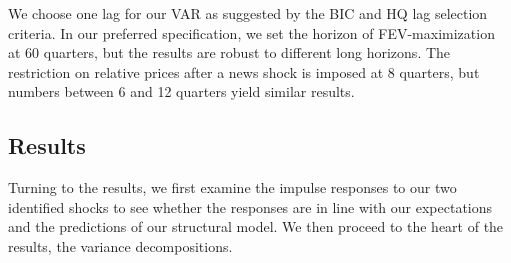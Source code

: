 \documentclass[11pt]{article}
\renewcommand{\[}{\begin{equation}}
\renewcommand{\]}{\end{equation}}
\begin{document}
We choose one lag for our VAR as suggested by the BIC and HQ lag selection criteria. In our preferred specification, we set the horizon of FEV-maximization at 60 quarters, but the results are robust to different long horizons. The restriction on relative prices after a news shock is imposed at 8 quarters, but numbers between 6 and 12 quarters yield similar results.


\subsection{Results}

Turning to the results, we first examine the impulse responses to our two identified shocks to see whether the responses are in line with our expectations and the predictions of our structural model. We then proceed to the heart of the results, the variance decompositions.
\end{document}
